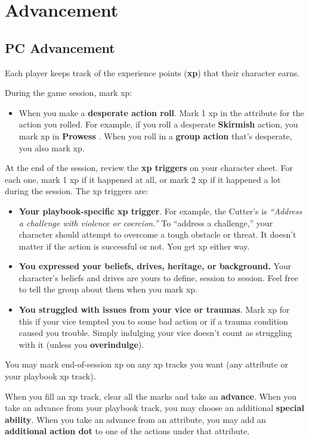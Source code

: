 \documentclass[11pt,oneside]{book}
\newcommand{\gameterm}[1]{\textbf{#1}}
\begin{document}
\chapter{Advancement}

\section{PC Advancement}

Each player keeps track of the experience points (\textbf{xp}) that their character earns.

During the game session, mark xp:

\begin{itemize}
	\item When you make a \textbf{desperate action roll}. Mark 1 xp in the attribute for the action you rolled. For example, if you roll a desperate \gameterm{Skirmish}  action, you mark xp in \gameterm{Prowess} \emph{.} When you roll in a \textbf{group action} that’s desperate, you also mark xp.
\end{itemize}

At the end of the session, review the \textbf{xp triggers} on your character sheet. For each one, mark 1 xp if it happened at all, or mark 2 xp if it happened a lot during the session. The xp triggers are:

\begin{itemize}
	\item \textbf{Your playbook-specific xp trigger}. For example, the Cutter’s is \emph{“Address a challenge with violence or coercion.”} To “address a challenge,” your character should attempt to overcome a tough obstacle or threat. It doesn’t matter if the action is successful or not. You get xp either way.
	\item \textbf{You expressed your beliefs, drives, heritage, or background.} Your character’s beliefs and drives are yours to define, session to session. Feel free to tell the group about them when you mark xp.
	\item \textbf{You struggled with issues from your vice or traumas}. Mark xp for this if your vice tempted you to some bad action or if a trauma condition caused you trouble. Simply indulging your vice doesn’t count as struggling with it (unless you \textbf{overindulge}).
\end{itemize}

You may mark end-of-session xp on any xp tracks you want (any attribute or your playbook xp track).

When you fill an xp track, clear all the marks and take an \textbf{advance}. When you take an advance from your playbook track, you may choose an additional \textbf{special ability}. When you take an advance from an attribute, you may add an \textbf{additional action dot} to one of the actions under that attribute.
\end{document}
